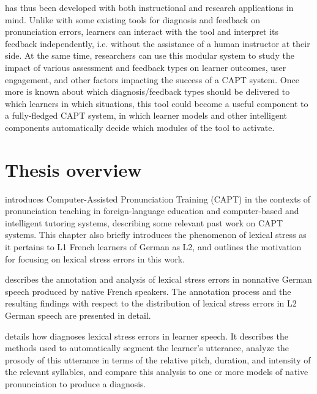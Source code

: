  has thus been developed with both instructional and research applications in mind.
Unlike with some existing tools for diagnosis and feedback on pronunciation errors, learners can interact with the tool and interpret its feedback independently, i.e. without the assistance of a human instructor at their side.
At the same time, researchers can use this modular system to study the impact of various assessment and feedback types on learner outcomes, user engagement, and other factors impacting the success of a CAPT system. 
%
Once more is known about which diagnosis/feedback types should be delivered to which learners in which situations, this tool could become a useful component to a fully-fledged CAPT system, in which learner models and other intelligent components automatically decide which modules of the tool to activate. 



\section{Thesis overview}
\label{sec:intro:overview}


 introduces Computer-Assisted Pronunciation Training (CAPT) in the contexts of pronunciation teaching in foreign-language education and computer-based and intelligent tutoring systems, describing some relevant past work on CAPT systems. This chapter also briefly 
introduces the phenomenon of lexical stress as it pertains to L1 French learners of German as L2, and outlines
the motivation for focusing on lexical stress errors in this work.


describes 
the annotation and analysis of lexical stress errors in 
nonnative German speech produced by native French speakers. 
 The annotation process and the resulting findings with respect to the distribution of lexical stress errors in L2 German speech are presented in detail.

 details how  diagnoses lexical stress errors in learner speech. It describes the methods used to automatically segment the learner's utterance, analyze the prosody of this utterance in terms of the relative pitch, duration, and intensity of the relevant syllables, and compare this analysis to one or more models of native pronunciation to produce a diagnosis.

